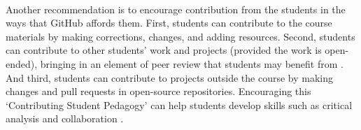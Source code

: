 \\

Another recommendation is to encourage contribution from the students in the ways that GitHub affords them. First, students can contribute to the course materials by making corrections, changes, and adding resources. Second, students can contribute to other students' work and projects (provided the work is open-ended), bringing in an element of peer review that students may benefit from \cite{sondergaard2012collaborative}. And third, students can contribute to projects outside the course by making changes and pull requests in open-source repositories. Encouraging this `Contributing Student Pedagogy' can help students develop skills such as critical analysis and collaboration \cite{falkner2012supporting}.


